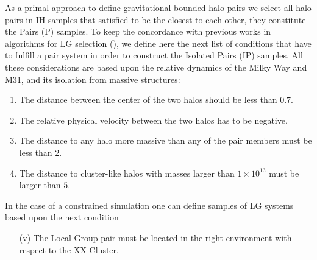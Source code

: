 \documentclass[usenatbib]{latex/mn2e}
\begin{document}
As a primal approach to define gravitational bounded halo pairs we select 
all halo pairs in IH samples that satisfied to be the closest to each 
other, they constitute the Pairs (P) samples. To keep the concordance with
previous works in algorithms for LG selection (\SRKED{[references here}), 
we define here the next list of conditions that have to fulfill a pair 
system in order to construct the Isolated Pairs (IP) samples. All these 
considerations are based upon the relative dynamics of the Milky Way and 
M31, and its isolation from massive structures:



\begin{enumerate}

\item{The distance between the center of the two halos should be less than 
$0.7$\hMpc.}

\item{The relative physical velocity between the two halos has to be 
negative.}

\item{The distance to any halo more massive than any of the pair members 
must be less than $2$\hMpc.}

\item{The distance to cluster-like halos with masses larger than 
$1\times10^{13}$ \hMsun must be larger than $5$\hMpc.}
\end{enumerate}


In the case of a constrained simulation one can define samples of LG 
systems based upon the next condition


\begin{enumerate}
\item[(v)]{The Local Group pair must be located in the right environment 
with respect to the XX Cluster.}
\end{enumerate}
\end{document}

